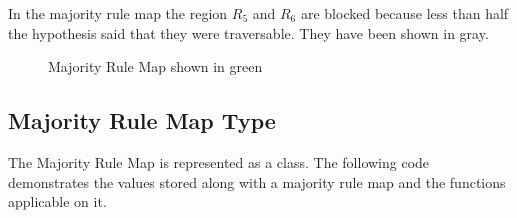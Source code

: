 In the majority rule map the region $R_{5}$ and $R_{6}$ are blocked because less than half the hypothesis said that they were
 traversable. They have been shown in gray.

\begin{figure}[h]
\begin{center}
\caption{\label{fig:Majority Rule Map}Majority Rule Map shown in green}
\end{center}
\end{figure}





\newpage
\subsection{Majority Rule Map Type}

The Majority Rule Map is represented as a class. The following code demonstrates the values stored along with a majority rule map and the 
functions applicable on it.




